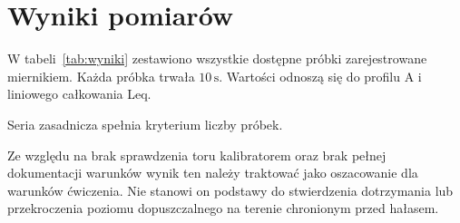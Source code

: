 \section{Wyniki pomiarów}
\label{sec:wyniki}
W tabeli~\ref{tab:wyniki} zestawiono wszystkie dostępne próbki
zarejestrowane miernikiem. Każda próbka trwała $10\,\mathrm{s}$.
Wartości odnoszą się do profilu A i liniowego całkowania Leq.
\begin{table}[htbp]
 \centering
 \caption{Równoważne poziomy dźwięku A w próbkach $10\,\mathrm{s}$.}
 \label{tab:wyniki}
 
\end{table}


\begin{table}[htbp]
 \centering
 \caption{Opracowanie serii i sprawdzenie wymaganej liczby próbek.}
 \label{tab:opracowanie}
 
\end{table}
Seria zasadnicza spełnia kryterium liczby próbek. 


Ze względu na brak sprawdzenia toru
kalibratorem oraz brak pełnej dokumentacji warunków wynik ten
należy traktować jako oszacowanie dla warunków ćwiczenia.
Nie stanowi on podstawy do stwierdzenia dotrzymania lub przekroczenia
poziomu dopuszczalnego na terenie chronionym przed hałasem.
